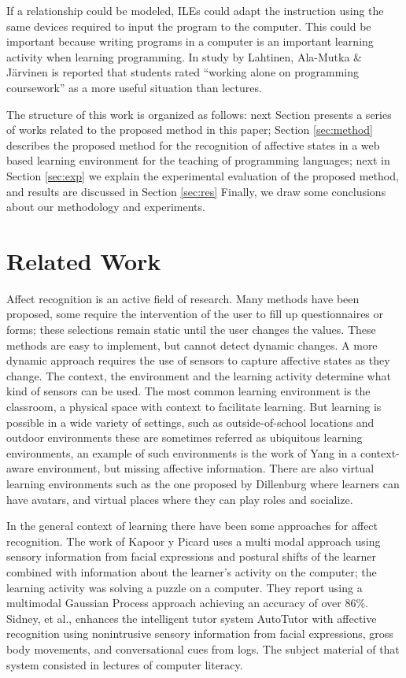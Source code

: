 \documentclass[a4paper]{llncs}
\begin{document}
If a relationship could be modeled, ILEs could adapt the instruction using the
same devices required to input the program to the computer. This could be
important because writing programs in a computer is an important learning
activity when learning programming. In study by Lahtinen, Ala-Mutka \& Järvinen
\cite{lahtinen2005study} is reported that students rated ``working alone on programming
coursework'' as a more useful situation than lectures.

The structure of this work is organized as follows: next Section 
presents a series of works related to the proposed method in this paper; Section
\ref{sec:method} describes the proposed method for the recognition of affective
states in a web based learning environment for the teaching of programming
languages; next in Section \ref{sec:exp} we explain the experimental evaluation of the
proposed method, and results are discussed in Section \ref{sec:res}  %
Finally, we draw some conclusions about our methodology and
experiments. 


\section{Related Work}

Affect recognition is an active field of research. Many
methods have been proposed, some require the intervention of the user to fill up
questionnaires or forms; these selections remain static until the user changes
the values. These methods are easy to implement, but cannot detect dynamic
changes.  A more dynamic approach requires the use of sensors to capture
affective states as they change. The context, the environment and the learning
activity determine what kind of sensors can be used. The most common learning
environment is the classroom, a physical space with context to facilitate
learning. But learning is possible in a wide variety of settings, such as
outside-of-school locations and outdoor environments these are sometimes
referred as ubiquitous learning environments, an example of such environments is
the work of Yang \cite{yang2006context} in a context-aware environment, but missing affective
information. There are also virtual learning environments such as the one proposed by Dillenburg
\cite{dillenbourg2002virtual}  where learners can have avatars, and virtual places
where they can play roles and socialize.

In the general context of learning there have been some approaches for affect
recognition. The work of Kapoor y Picard \cite{kapoor2005multimodal} uses a multi modal
approach using sensory information from facial expressions and postural shifts
of the learner combined with information about the learner's activity on the
computer; the learning activity was solving a puzzle on a computer. They report
using a multimodal Gaussian Process approach achieving an accuracy of over 86\%.
Sidney, et al., \cite{sidney2005integrating} enhances the intelligent tutor system AutoTutor with
affective recognition using nonintrusive sensory information from facial
expressions, gross body movements, and conversational cues from logs.  The
subject material of that system consisted in lectures of computer literacy.
\end{document}
